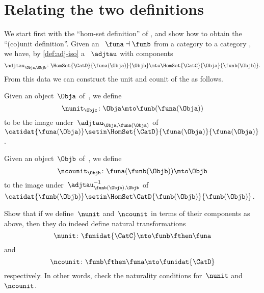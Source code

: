 
\section{Relating the two definitions}
\label{relate-adj-defs}

We start first with the ``hom-set definition'' of , and show how to obtain the ``(co)unit definition''.
Given an ~$\funa \dashv \funb$ from a category \CatC to a category \CatD, we have, by \cref{def:adj-iso} a ~$\adjtau$ with components
\begin{equation}
    \adjtau_{\Obja,\Objb} \colon \HomSet{\CatD}{\funa(\Obja)}{\Objb} \mto \HomSet{\CatC}{\Obja}{\funb(\Objb)}.
\end{equation}
From this data we can construct the unit and counit of the  as follows.

Given an object~$\Obja$ of~\CatC, we define
%
\begin{equation}
    \nunit_\Objc \colon \Obja \mto \funb(\funa(\Obja))
\end{equation}
%
to be the image under~$\adjtau_{\Obja, \funa(\Obja)}$ of~$\catidat{\funa(\Obja)} \setin \HomSet{\CatD}{\funa (\Obja)}{\funa(\Obja)}$.

Given an object~$\Objb$ of~\CatD, we define
\begin{equation}
    \ncounit_\Objb \colon \funa(\funb(\Objb)) \mto \Objb
\end{equation}
to the image under~$\adjtau_{\funb(\Objb), \Objb}^{-1}$ of~$\catidat{\funb(\Objb)} \setin \HomSet\CatD{\funb(\Objb)}{\funb(\Objb)}$.

\begin{exercise}
    \label{ex:eta-epsilon}

    Show that if we define~$\nunit$ and~$\ncounit$ in terms of their components as above, then they do indeed define natural transformations
    \begin{equation}
        \nunit\colon \funidat{\CatC} \nto \funb\fthen \funa
    \end{equation}
    and
    \begin{equation}
        \ncounit\colon \funb \fthen \funa \nto \funidat{\CatD}
    \end{equation}
    respectively.
    In other words, check the naturality conditions for~$\nunit$ and~$\ncounit$.
\end{exercise}

